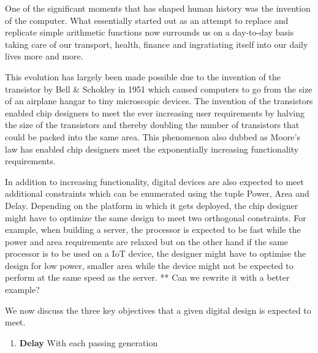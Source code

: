 One of the significant moments that has shaped human history was the invention of the computer. What essentially started out as an attempt to replace and replicate simple arithmetic functions now surrounds us on a day-to-day basis taking care of our transport, health, finance and ingratiating itself into our daily lives more and more. 

This evolution has largely been made possible due to the invention of the transistor by Bell & Schokley in 1951 which caused computers to go from the size of an airplane hangar to tiny microscopic devices.  The invention of the transistors enabled chip designers to meet the ever increasing user requirements by halving the size of the transistors and thereby doubling the number of transistors that could be packed into the same area. This phenomenon also dubbed as Moore’s law has enabled chip designers meet the exponentially increasing functionality requirements.

In addition to increasing functionality, digital devices are also expected to meet additional constraints which can be enumerated using the tuple {Power, Area and Delay}. Depending on the platform in which it gets deployed, the chip designer might have to optimize the same design to meet  two orthogonal constraints. For example, when building a server, the processor is expected to be fast while the power and area requirements are relaxed but on the other hand if the same processor is to be used on a IoT device, the designer might have to optimise the design for low power, smaller area while the device might not be expected to perform at the same speed as the server. **{ Can we rewrite it with a better example?}

We now discuss the three key objectives that a given digital design is expected to meet. 
\begin{enumerate}
    \item \textbf{Delay} With each passing generation 
\end{enumerate}








